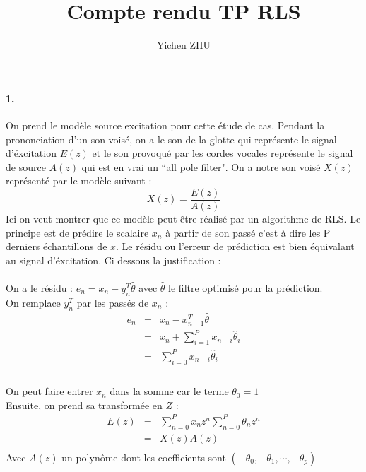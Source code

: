 \documentclass{article}
\author{Yichen ZHU}
\title{Compte rendu TP RLS}
\begin{document}
\maketitle

\paragraph{1.} On prend le mod\`ele source excitation pour cette \'etude de cas. Pendant la prononciation d'un son vois\'e, on a le son de la glotte qui repr\'esente le signal d'\'excitation $E(z)$ et le son provoqu\'e par les cordes vocales repr\'esente le signal de source $A(z)$ qui est en vrai un ``all pole filter". On a notre son vois\'e $X(z)$ repr\'esent\'e par le mod\`ele suivant :
\[
X(z) = \frac{E(z)}{A(z)}
\]
Ici on veut montrer que ce mod\`ele peut \^etre r\'ealis\'e par un algorithme de RLS. Le principe est de pr\'edire le scalaire $x_{n}$ \`a partir de son pass\'e c'est \`a dire les P derniers \'echantillons de $x$. Le r\'esidu ou l'erreur de pr\'ediction est bien \'equivalant au signal d'\'excitation. Ci dessous la justification : 
\\
\\On a le r\'esidu : $e_{n} = x_{n} - y^{T}_{n}\widehat{\theta}$ avec $\widehat{\theta}$ le filtre optimis\'e pour la pr\'ediction.
\\On remplace $y^{T}_{n}$ par les pass\'es de $x_{n}$ : 
\begin{eqnarray*}
e_{n} &=& x_{n} - x^{T}_{n-1}\widehat{\theta} \\
      &=& x_{n} + \sum^{P}_{i=1}x_{n-i}\widehat{\theta}_{i} \\
			&=& \sum^{P}_{i=0}x_{n-i}\widehat{\theta}_{i} \\
\end{eqnarray*}	
\\On peut faire entrer $x_{n}$ dans la somme car le terme $\theta_{0}=1$
\\Ensuite, on prend sa transform\'ee en $Z$ : 
\begin{eqnarray*}
E(z) &=& \sum_{n=0}^{P}x_{n}z^{n}\sum_{n=0}^{P}\theta_{n}z^{n} \\
     &=&  X(z)A(z) \\
\end{eqnarray*}
Avec $A(z)$ un polyn\^ome dont les coefficients sont $(-\theta_{0},-\theta_{1},\cdots,-\theta_{p})$
\end{document}
